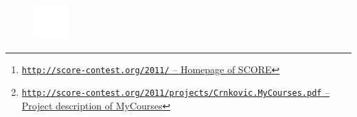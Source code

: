 \documentclass[a4paper, 11pt]{article}
\newcommand{\link}[2]{\footnote{\href{#1}{\texttt{#1} – #2}}}
\begin{document}
\begin{multicols}{2}

\tableofcontents

\raggedcolumns
\columnbreak

\begin{abstract}
This document summarizes the activities of a team of undergraduate students participating in the student contest on software engineering [SCORE] 2011\link{http://score-contest.org/2011/}{Homepage of SCORE}. The carried out project was \emph{MyCourses}\link{http://score-contest.org/2011/projects/Crnkovic.MyCourses.pdf}{Project description of MyCourses}. The document contains descriptions of the work done during the development process, in particular about the requirement solicitation, requirements specification, design and the implementation. 
\end{abstract}














\end{multicols}
\begin{multicols}{2}

\nocite{*}



\begin{figure}[H]
\includegraphics[width=\columnwidth]{images/hack_whitespace.png}
\end{figure}

\end{multicols}
\end{document}
